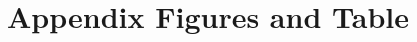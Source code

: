 \singlespacing
\renewcommand{\thetable}{A.\arabic{table}}
\setcounter{table}{0}
\renewcommand{\thefootnote}{A.\arabic{footnote}}
\setcounter{footnote}{0}
\section{\label{sec:app:tabfig}Appendix Figures and Table}


%

%

%



